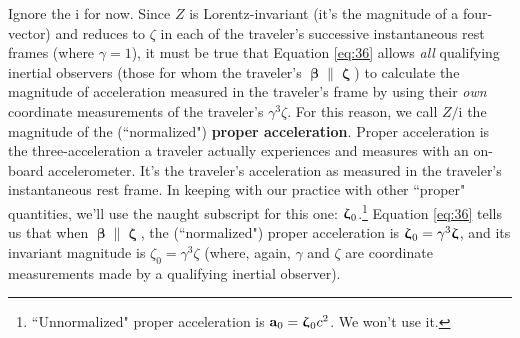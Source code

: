 \documentclass[12pt]{article}
\renewcommand{\vv}[1]{\mathbf{#1}}
\newcommand{\vvbeta}{\bm{\upbeta}}
\newcommand{\vvzeta}{\bm{\upzeta}}
\begin{document}
Ignore the $\mathrm{i}$ for now. Since $Z$ is Lorentz-invariant (it's the magnitude of a four-vector) and reduces to $\zeta$ in each of the traveler's successive instantaneous rest frames (where $\gamma = 1$), it must be true that Equation \ref{eq:36} allows \emph{all} qualifying inertial observers (those for whom the traveler's $\vvbeta \parallel \vvzeta$) to calculate the magnitude of acceleration measured in the traveler's frame by using their \emph{own} coordinate measurements of the traveler's $\gamma^3 \zeta$. For this reason, we call $Z / \mathrm{i}$ the magnitude of the (``normalized") \textbf{proper acceleration}. Proper acceleration is the three-acceleration a traveler actually experiences and measures with an on-board accelerometer. It's the traveler's acceleration as measured in the traveler's instantaneous rest frame. In keeping with our practice with other ``proper" quantities, we'll use the naught subscript for this one: $\vvzeta_{\mkern1mu 0}$.\footnote{``Unnormalized" proper acceleration is $\vv a_0 = \vvzeta_{\mkern1mu 0} c^2$. We won't use it.} Equation \ref{eq:36} tells us that when $\vvbeta \parallel \vvzeta$, the (``normalized") proper acceleration is $\vvzeta_{\mkern1mu 0} = \gamma^3 \vvzeta$, and its invariant magnitude is $\zeta_0 = \gamma^3 \zeta$ (where, again, $\gamma$ and $\zeta$ are coordinate measurements made by a qualifying inertial observer).
\end{document}
